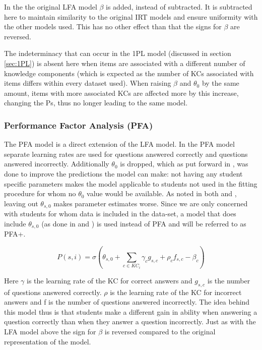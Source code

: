 \documentclass{scrartcl}
\begin{document}
In the the original LFA model $\beta$ is added, instead of subtracted. It is subtracted here to maintain similarity to the original IRT models and ensure uniformity with the other models used. This has no other effect than that the signs for $\beta$ are reversed.

The indeterminacy that can occur in the 1PL model (discussed in section \ref{sec:1PL}) is absent here when items are associated with a different number of knowledge components (which is expected as the number of KCs associated with items differs within every dataset used). When raising $\beta$ and $\theta_{0}$ by the same amount, items with more associated KCs are affected more by this increase, changing the Ps, thus no longer leading to the same model. 


\subsubsection{Performance Factor Analysis (PFA)}
\label{sec:pfa}
The PFA model is a direct extension of the LFA model. In the PFA model separate learning rates are used for questions answered correctly and questions answered incorrectly. Additionally $\theta_{0}$ is dropped, which as put forward in \cite{pfa}, was done to improve the predictions the model can make: not having any student specific parameters makes the model applicable to students not used in the fitting procedure for whom no $\theta_{0}$ value would be available. As noted in both \cite{ktpfa} and \cite{blackart}, leaving out $\theta_{s,0}$ makes parameter estimates worse. Since we are only concerned with students for whom data is included in the data-set, a model that does include $\theta_{s,0}$ (as done in \cite{ktpfa} and \cite{blackart}) is used instead of PFA and will be referred to as PFA+.

\begin{equation}
\label{eq:pfa}
P(s,i) = \sigma(\theta_{s,0} + \sum_{c \in KC_{i}}  \gamma_{c} g_{s,c} + \rho_{c} f_{s,c} - \beta_{c})
\end{equation}


Here $\gamma$ is the learning rate of the KC for correct answers and $g_{s,c}$ is the number of questions answered correctly. $\rho$ is the learning rate of the KC for incorrect answers and f is the number of questions answered incorrectly. The idea behind this model thus is that students make a different gain in ability when answering a question correctly than when they answer a question incorrectly. Just as with the LFA model above the sign for $\beta$ is reversed compared to the original representation of the model.
\end{document}
